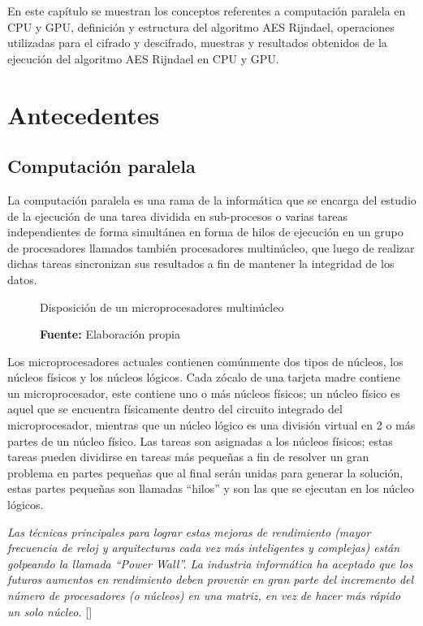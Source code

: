 \documentclass[../main/main.tex]{subfiles}
\begin{document}
\espacio
  En este capítulo se muestran los conceptos referentes a computación paralela en CPU y GPU, definición y estructura del algoritmo AES Rijndael, operaciones utilizadas para el cifrado y descifrado, muestras y resultados obtenidos de la ejecución del algoritmo AES Rijndael en CPU y GPU.

  \section{Antecedentes}

  \subsection{Computación paralela}

  La computación paralela es una rama de la informática que se encarga del estudio de la ejecución de una tarea dividida en sub-procesos o varias tareas independientes de forma simultánea en forma de hilos de ejecución en un grupo de procesadores llamados también procesadores multinúcleo, que luego de realizar dichas tareas sincronizan sus resultados a fin de mantener la integridad de los datos.

  \begin{figure}
    \centering
    \caption{Disposición de un microprocesadores multinúcleo}
    
    \caption*{\textbf{Fuente:} Elaboración propia}
  \end{figure}

  Los microprocesadores actuales contienen comúnmente dos tipos de núcleos, los núcleos físicos y los núcleos lógicos. Cada zócalo de una tarjeta madre contiene un microprocesador, este contiene uno o más núcleos físicos; un núcleo físico es aquel que se encuentra físicamente dentro del circuito integrado del microprocesador, mientras que un núcleo lógico es una división virtual en 2 o más partes de un núcleo físico. Las tareas son asignadas a los núcleos físicos; estas tareas pueden dividirse en tareas más pequeñas a fin de resolver un gran problema en partes pequeñas que al final serán unidas para generar la solución, estas partes pequeñas son llamadas ``hilos'' y son las que se ejecutan en los núcleo lógicos.

  \textit{Las técnicas principales para lograr estas mejoras de rendimiento (mayor frecuencia de reloj y arquitecturas cada vez más inteligentes y complejas) están golpeando la llamada ``Power Wall''. La industria informática ha aceptado que los futuros aumentos en rendimiento deben provenir en gran parte del incremento del número de procesadores (o núcleos) en una matriz, en vez de hacer más rápido un solo núcleo.} [\cite[p.~6]{report:parallel_computing_illinois}]
\end{document}
